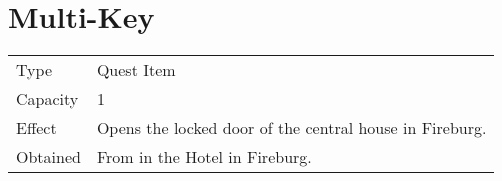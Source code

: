 \section{Multi-Key}
\label{item:multi_key}


\noindent\begin{tabularx}{\textwidth}[l]{lX}
	Type
	& Quest Item
\\ %
	Capacity
	& 1
\\ %
	Effect
	& Opens the locked door of the central house in Fireburg.
\\ %
	Obtained
	& From \nameref{char:tristam} in the Hotel in Fireburg.
\end{tabularx}
